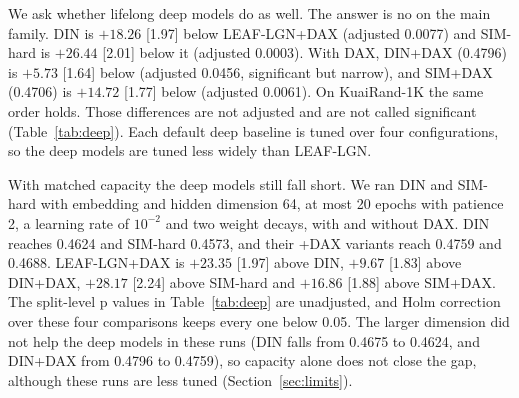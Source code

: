 \documentclass[preprint,12pt,authoryear]{elsarticle}
\begin{document}
We ask whether lifelong deep models do as well. The answer is no on the main family. DIN is $+18.26$ [1.97] below LEAF-LGN+DAX (adjusted 0.0077) and SIM-hard is
$+26.44$ [2.01] below it (adjusted 0.0003). With DAX, DIN+DAX (0.4796) is $+5.73$ [1.64] below (adjusted 0.0456, significant but narrow), and SIM+DAX (0.4706)
is $+14.72$ [1.77] below (adjusted 0.0061). On KuaiRand-1K the same order holds. Those differences are not adjusted and are not called significant
(Table~\ref{tab:deep}). Each default deep baseline is tuned over four configurations, so the deep models are tuned less widely than LEAF-LGN.

With matched capacity the deep models still fall short. We ran DIN and SIM-hard with embedding and hidden dimension 64, at most 20 epochs
with patience 2, a learning rate of $10^{-2}$ and two weight decays, with and without DAX. DIN reaches 0.4624 and SIM-hard 0.4573, and their
+DAX variants reach 0.4759 and 0.4688. LEAF-LGN+DAX is $+23.35$ [1.97] above DIN, $+9.67$ [1.83] above DIN+DAX, $+28.17$ [2.24] above SIM-hard
and $+16.86$ [1.88] above SIM+DAX. The split-level p values in Table~\ref{tab:deep} are unadjusted, and Holm correction over these four
comparisons keeps every one below 0.05. The larger dimension did not help the deep models in these runs (DIN falls from 0.4675 to 0.4624, and DIN+DAX from 0.4796 to 0.4759), so capacity alone does not close the gap, although these runs are less tuned (Section~\ref{sec:limits}).
\end{document}
